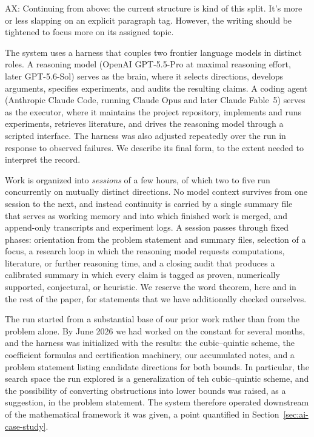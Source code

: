 {\color{red}AX: Continuing from above: the current structure is kind of this split. It's more or less slapping on an explicit paragraph tag. However, the writing should be tightened to focus more on its assigned topic.}


The system uses a harness that couples two frontier language
models in distinct roles. A reasoning model (OpenAI GPT-5.5-Pro at maximal
reasoning effort, later GPT-5.6-Sol) serves as the brain, where it selects
directions, develops arguments, specifies experiments, and audits the
resulting claims. A coding agent (Anthropic Claude Code, running Claude Opus
and later Claude Fable~5) serves as the executor, where it maintains the project
repository, implements and runs experiments, retrieves literature, and
drives the reasoning model through a scripted interface. The harness was also adjusted repeatedly over the
run in response to observed failures. We describe its final form, to the
extent needed to interpret the record.


Work is organized into \emph{sessions} of a few hours, of which two to
five run concurrently on mutually distinct directions. No model context survives from
one session to the next, and instead continuity is carried by a single summary file that serves as
working memory and into which finished work is merged, and append-only
transcripts and experiment logs. A session passes through fixed phases:
orientation from the problem statement and summary files, selection of a focus, a research loop in
which the reasoning model requests computations, literature, or further
reasoning time, and a closing audit that produces a calibrated summary in
which every claim is tagged as proven, numerically supported, conjectural,
or heuristic. We reserve the word theorem, here and in the rest
of the paper, for statements that we have additionally checked ourselves.

The run started from a substantial base of our prior work rather than from
the problem alone. By June 2026 we had worked on the constant for several
months, and the harness was initialized with the results: the cubic--quintic scheme, the coefficient formulas and certification machinery, our accumulated notes, and a
problem statement listing candidate directions for both bounds. In
particular, the search space the run explored is a generalization of teh cubic--quintic scheme, and the possibility of converting
obstructions into lower bounds was raised, as a suggestion, in the problem
statement. The system therefore operated downstream of the mathematical
framework it was given, a point quantified in
Section~\ref{sec:ai-case-study}.

